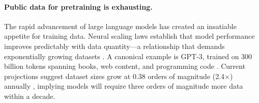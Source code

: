 



\paragraph{Public data for pretraining is exhausting.} The rapid advancement of large language models has created an insatiable appetite for training data. Neural scaling laws establish that model performance improves predictably with data quantity—a relationship that demands exponentially growing datasets \cite{hoffmann2022training}. A canonical example is GPT-3, trained on {300 billion tokens} spanning books, web content, and programming code \cite{brown2020language}. Current projections suggest dataset sizes grow at 0.38 orders of magnitude (2.4$\times$) annually \cite{villalobos2022trends}, implying models will require {three orders of magnitude more data} within a decade.

